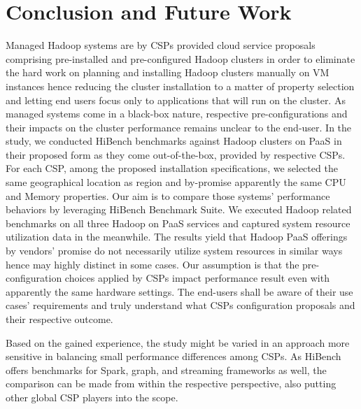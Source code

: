 \documentclass[review]{elsarticle}
\begin{document}
\section{Conclusion and Future Work}
Managed Hadoop systems are by CSPs provided cloud service proposals comprising pre-installed and pre-configured Hadoop clusters in order to eliminate the hard work on planning and installing Hadoop clusters manually on VM instances hence reducing the cluster installation to a matter of property selection and letting end users focus only to applications that will run on the cluster. As managed systems come in a black-box nature, respective pre-configurations and their impacts on the cluster performance remains unclear to the end-user. In the study, we conducted HiBench benchmarks against Hadoop clusters on PaaS in their proposed form as they come out-of-the-box, provided by respective CSPs. For each CSP, among the proposed installation specifications, we selected the same geographical location as region and by-promise apparently the same CPU and Memory properties. Our aim is to compare those systems' performance behaviors by leveraging HiBench Benchmark Suite. We executed Hadoop related benchmarks on all three Hadoop on PaaS services and captured system resource utilization data in the meanwhile. The results yield that Hadoop PaaS offerings by vendors' promise do not necessarily utilize system resources in similar ways hence may highly distinct in some cases. Our assumption is that the pre-configuration choices applied by CSPs impact performance result even with apparently the same hardware settings. The end-users shall be aware of their use cases' requirements and truly understand what CSPs configuration proposals and their respective outcome.

Based on the gained experience, the study might be varied in an approach more sensitive in balancing small performance differences among CSPs. As HiBench offers benchmarks for Spark, graph, and streaming frameworks as well, the comparison can be made from within the respective perspective, also putting other global CSP players into the scope.


\end{document}
